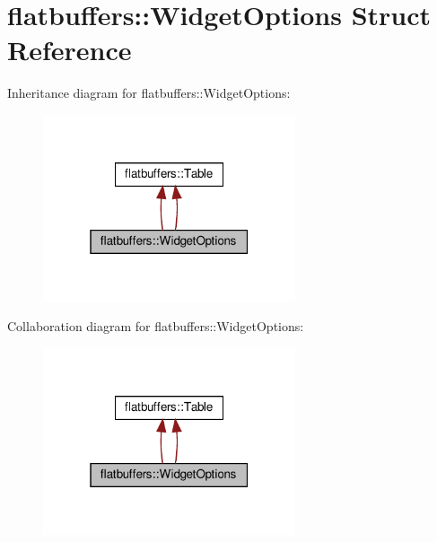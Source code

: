 \hypertarget{structflatbuffers_1_1WidgetOptions}{}\section{flatbuffers\+:\+:Widget\+Options Struct Reference}
\label{structflatbuffers_1_1WidgetOptions}


Inheritance diagram for flatbuffers\+:\+:Widget\+Options\+:
\nopagebreak
\begin{figure}[H]
\begin{center}
\leavevmode
\includegraphics[width=211pt]{structflatbuffers_1_1WidgetOptions__inherit__graph}
\end{center}
\end{figure}


Collaboration diagram for flatbuffers\+:\+:Widget\+Options\+:
\nopagebreak
\begin{figure}[H]
\begin{center}
\leavevmode
\includegraphics[width=211pt]{structflatbuffers_1_1WidgetOptions__coll__graph}
\end{center}
\end{figure}
